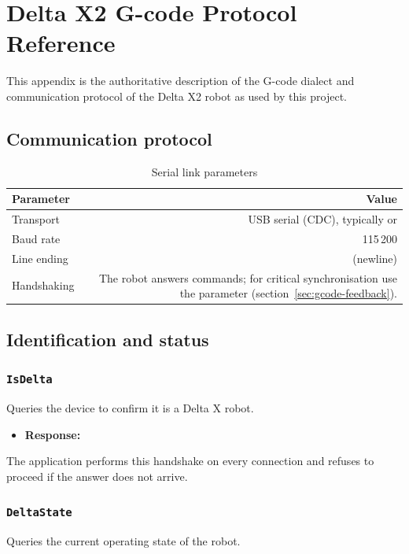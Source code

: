 \chapter{Delta X2 G-code Protocol Reference}
\label{app:gcode}
%

This appendix is the authoritative description of the G-code dialect and
communication protocol of the Delta X2 robot as used by this project.

\section{Communication protocol}
\begin{table}[h]
  \centering
  \begin{tabularx}{\textwidth}{lD}
    \toprule
    \textbf{Parameter} & \textbf{Value} \\
    \midrule
    Transport & USB serial (CDC), typically  or  \\
    Baud rate & 115\,200 \\
    Line ending &  (newline) \\
    Handshaking & The robot answers commands; for critical synchronisation
      use the  parameter (section~\ref{sec:gcode-feedback}). \\
    \bottomrule
  \end{tabularx}
  \caption{Serial link parameters}
\end{table}

\section{Identification and status}

\subsection{\texttt{IsDelta}}
%
Queries the device to confirm it is a Delta X robot.
\begin{itemize}
  \item \textbf{Response:} 
\end{itemize}
The application performs this handshake on every connection and refuses
to proceed if the answer does not arrive.

\subsection{\texttt{DeltaState}}
%
Queries the current operating state of the robot.

